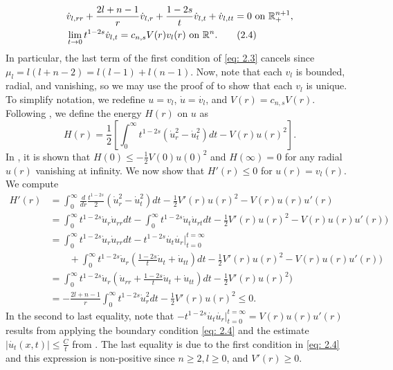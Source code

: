 \documentclass{article}
\begin{document}
\begin{align*}
    &\dot{v}_{l, rr} + \frac{2l+n-1}{r}{\dot{v}}_{l,r} + \frac{1-2s}{t}\dot{v}_{l,t} + {\dot{v}}_{l, tt}  = 0 \textrm{ on } \mathbb{R}^{n+1}_+,\\
    &\lim\limits_{t \to 0} t^{1-2s}\dot{v}_{l,t}  = c_{n,s}V(r){v}_l(r) \textrm{ on } \mathbb{R}^n.
\tag{2.4} \label{eq: 2.4}
\end{align*}
In particular, the last term of the first condition of \eqref{eq: 2.3} cancels since $\mu_l = l(l+n-2) = l(l-1)+l(n-1)$. Now, note that each $v_l$ is bounded, radial, and vanishing, so we may use the proof of \cite[Thm 1]{Frank} to show that each $v_l$ is unique. To simplify notation, we redefine $u=v_l$, $\dot{u}=\dot{v_l}$, and $V(r)=c_{n,s}V(r)$. Following \cite[(4.6)]{Frank}, we define the energy $H(r)$ on $u$ as
\begin{equation}
    H(r) = \frac{1}{2}\left[\int_{0}^{\infty}t^{1-2s}(\dot{u}_{r}^2-\dot{u}_{t}^2)dt -V(r) u (r)^2\right].
    \tag{2.5} \label{eq: 2.5}
    \end{equation}
In \cite[Prop B.2]{Frank}, it is shown that $H(0) \le -\frac{1}{2} V(0)u(0)^2$ and $H(\infty) = 0$  for any radial $u(r)$ vanishing at infinity. We now show that $H'(r) \le 0$ for $u(r)=v_l(r)$. We compute
\begin{align}
H'(r) &= \int_{0}^{\infty}\frac{d}{dr}\frac{t^{1-2s}}{2}(\dot{u}_r^2-\dot{u}_t^2)dt  - \frac{1}{2}V'(r)u(r)^2 - V(r)u(r)u'(r) \nonumber \\
                &= \int_{0}^{\infty}t^{1-2s}\dot{u}_r \dot{u}_{rr} dt - \int_{0}^{\infty}t^{1-2s}\dot{u}_t \dot{u}_{rt}dt -  \frac{1}{2}V'(r)u(r)^2 - V(r)u(r)u'(r) ) \nonumber \\ 
                &= \int_{0}^{\infty}t^{1-2s}\dot{u}_r \dot{u}_{rr}dt - t^{1-2s}\dot{u_t}\dot{u_r} \vert_{t=0}^{t=\infty}  \nonumber   \\
                 & \qquad   + \int_{0}^{\infty}t^{1-2s}\dot{u}_r \left(\frac{1-2s}{t}\dot{u}_{t} + \dot{u}_{tt}\right)dt - \frac{1}{2}V'(r)u(r)^2 - V(r)u(r)u'(r) ) \nonumber \\
                & =  \int_{0}^{\infty}t^{1-2s}\dot{u}_r\left(\dot{u}_{rr} + \frac{1-2s}{t}\dot{u}_t + \dot{u}_{tt}\right)dt  - \frac{1}{2}V'(r)u(r)^2 ) \nonumber \\
                & = -\frac{2l+n-1}{r}\int_{0}^{\infty}t^{1-2s}\dot{u}_r^2dt-\frac{1}{2}V'(r)u(r)^2 \le 0.
\tag{2.6} \label{eq: 2.6}
\end{align}
In the second to last equality, note that $-t^{1-2s}\dot{u_t}\dot{u_r} \vert_{t=0}^{t=\infty} = V(r)u(r)u'(r)$ results from applying the boundary condition \eqref{eq: 2.4} and the estimate $|\dot{u_t}(x,t)| \le \frac{C}{t}$ from \cite[Prop 4.6]{cabre}. The last equality is due to the first condition in \eqref{eq: 2.4} and this expression is non-positive since $n \ge 2, l \ge 0$, and $V'(r) \ge 0$.
\end{document}
